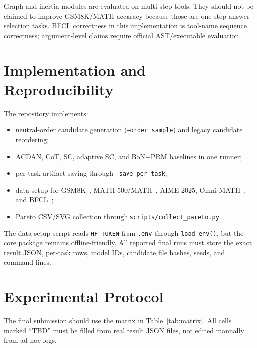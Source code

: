 \documentclass[letterpaper]{article} %
\begin{document}
Graph and inertia modules are evaluated on multi-step tools. They should not be
claimed to improve GSM8K/MATH accuracy because those are one-step
answer-selection tasks. BFCL correctness in this implementation is tool-name
sequence correctness; argument-level claims require official AST/executable
evaluation.

\section{Implementation and Reproducibility}
The repository implements:
\begin{itemize}
\item neutral-order candidate generation (\texttt{--order sample}) and legacy
candidate reordering;
\item ACDAN, CoT, SC, adaptive SC, and BoN+PRM baselines in one runner;
\item per-task artifact saving through \texttt{--save-per-task};
\item data setup for GSM8K~\citep{cobbe2021gsm8k}, MATH-500/MATH~\citep{hendrycks2021math},
AIME 2025, Omni-MATH~\citep{omnimath2024}, and BFCL~\citep{bfcl2024};
\item Pareto CSV/SVG collection through \texttt{scripts/collect\_pareto.py}.
\end{itemize}
The data setup script reads \texttt{HF\_TOKEN} from \texttt{.env} through
\texttt{load\_env()}, but the core package remains offline-friendly. All
reported final runs must store the exact result JSON, per-task rows, model IDs,
candidate file hashes, seeds, and command lines.

\section{Experimental Protocol}
The final submission should use the matrix in Table~\ref{tab:matrix}. All cells
marked ``TBD'' must be filled from real result JSON files, not edited manually
from ad hoc logs.
\end{document}
